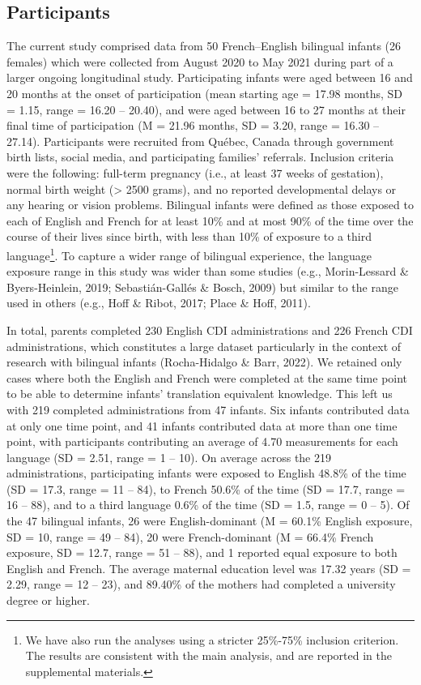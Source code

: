 \documentclass[
  ,man,floatsintext]{apa6}
\begin{document}
\hypertarget{participants}{%
\subsection{Participants}\label{participants}}

The current study comprised data from 50 French--English bilingual infants (26 females) which were collected from August 2020 to May 2021 during part of a larger ongoing longitudinal study. Participating infants were aged between 16 and 20 months at the onset of participation (mean starting age = 17.98 months, SD = 1.15, range = 16.20 -- 20.40), and were aged between 16 to 27 months at their final time of participation (M = 21.96 months, SD = 3.20, range = 16.30 -- 27.14). Participants were recruited from Québec, Canada through government birth lists, social media, and participating families' referrals. Inclusion criteria were the following: full-term pregnancy (i.e., at least 37 weeks of gestation), normal birth weight (\textgreater{} 2500 grams), and no reported developmental delays or any hearing or vision problems. Bilingual infants were defined as those exposed to each of English and French for at least 10\% and at most 90\% of the time over the course of their lives since birth, with less than 10\% of exposure to a third language\footnote{We have also run the analyses using a stricter 25\%-75\% inclusion criterion. The results are consistent with the main analysis, and are reported in the supplemental materials.}. To capture a wider range of bilingual experience, the language exposure range in this study was wider than some studies (e.g., Morin-Lessard \& Byers-Heinlein, 2019; Sebastián-Gallés \& Bosch, 2009) but similar to the range used in others (e.g., Hoff \& Ribot, 2017; Place \& Hoff, 2011).

In total, parents completed 230 English CDI administrations and 226 French CDI administrations, which constitutes a large dataset particularly in the context of research with bilingual infants (Rocha-Hidalgo \& Barr, 2022). We retained only cases where both the English and French were completed at the same time point to be able to determine infants' translation equivalent knowledge. This left us with 219 completed administrations from 47 infants. Six infants contributed data at only one time point, and 41 infants contributed data at more than one time point, with participants contributing an average of 4.70 measurements for each language (SD = 2.51, range = 1 -- 10). On average across the 219 administrations, participating infants were exposed to English 48.8\% of the time (SD = 17.3, range = 11 -- 84), to French 50.6\% of the time (SD = 17.7, range = 16 -- 88), and to a third language 0.6\% of the time (SD = 1.5, range = 0 -- 5). Of the 47 bilingual infants, 26 were English-dominant (M = 60.1\% English exposure, SD = 10, range = 49 -- 84), 20 were French-dominant (M = 66.4\% French exposure, SD = 12.7, range = 51 -- 88), and 1 reported equal exposure to both English and French. The average maternal education level was 17.32 years (SD = 2.29, range = 12 -- 23), and 89.40\% of the mothers had completed a university degree or higher.
\end{document}
